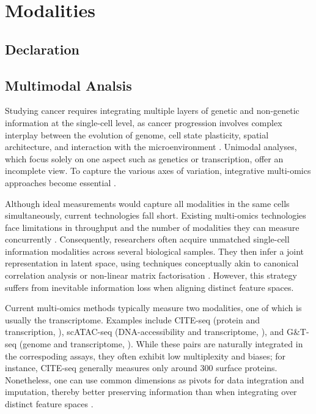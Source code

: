 \chapter{Modalities}
\label{sec:chapter-basiss-multimodal}

\section*{Declaration}

\section{Multimodal Analsis}

Studying cancer requires integrating multiple layers of genetic and non-genetic information at the single-cell level, as cancer progression involves complex interplay between the evolution of genome, cell state plasticity, spatial architecture, and interaction with the microenvironment . Unimodal analyses, which focus solely on one aspect such as genetics or transcription, offer an incomplete view. To capture the various axes of variation, integrative multi-omics approaches become essential \parencite{Nam2021-xt,Baysoy2023-qr}.

Although ideal measurements would capture all modalities in the same cells simultaneously, current technologies fall short. Existing multi-omics technologies face limitations in throughput and the number of modalities they can measure concurrently \parencite{Baysoy2023-qr}. Consequently, researchers often acquire unmatched single-cell information modalities across several biological samples. They then infer a joint representation in latent space, using techniques conceptually akin to canonical correlation analysis \parencite{Stuart2019-mi} or non-linear matrix factorisation \parencite{Argelaguet2018-oz,Velten2022-gc}. However, this strategy suffers from inevitable information loss when aligning distinct feature spaces.

Current multi-omics methods typically measure two modalities, one of which is usually the transcriptome. Examples include CITE-seq (protein and transcription, \textcite{Stoeckius2017-rz}), scATAC-seq (DNA-accessibility and transcriptome, \textcite{Lareau2019-xr}), and G\&T-seq (genome and transcriptome, \textcite{Macaulay2015-gh}). While these pairs are naturally integrated in the correspoding assays, they often exhibit low multiplexity and biases; for instance, CITE-seq generally measures only around 300 surface proteins. Nonetheless, one can use common dimensions as pivots for data integration and imputation, thereby better preserving information than when integrating over distinct feature spaces \parencite{Hao2021-qn}.


